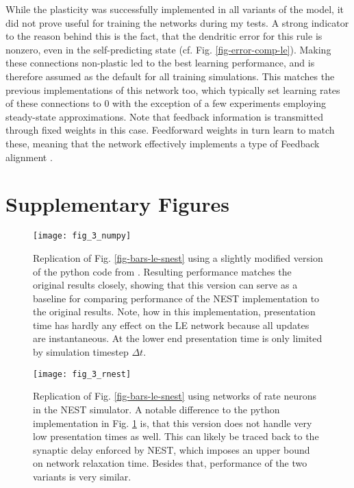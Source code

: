 While the plasticity was successfully implemented in all variants of the model, it did not prove useful for training the
networks during my tests. A strong indicator to the reason behind this is the fact, that the dendritic error for this
rule is nonzero, even in the self-predicting state (cf. Fig. \ref{fig-error-comp-le}). Making these connections
non-plastic led to the best learning performance, and is therefore assumed as the default for all training simulations.
This matches the previous implementations of this network too, which typically set learning rates of these connections
to $0$ with the exception of a few experiments employing steady-state approximations. Note that feedback information is
transmitted through fixed weights in this case. Feedforward weights in turn learn to match these, meaning that the
network effectively implements a type of Feedback alignment \cite{Lillicrap2014}.

\newpage
\section{Supplementary Figures}


\renewcommand{\thefigure}{S\arabic{figure}}
\begin{figure}[h!]
  \centering
  \texttt{[image: fig\_3\_numpy]}
  \caption{Replication of Fig. \ref{fig-bars-le-snest} using a slightly modified version of the python code from
    \cite{Haider2021}. Resulting performance matches the original results closely, showing that this version can serve
    as a baseline for comparing performance of the NEST implementation to the original results. Note, how in this
    implementation, presentation time has hardly any effect on the LE network because all updates are instantaneous.
    At the lower end presentation time is only limited by simulation timestep $\Delta t$.}
  \label{fig-bars-le-numpy}
\end{figure}


\begin{figure}[h!]
  \centering
  \texttt{[image: fig\_3\_rnest]}
  \caption{Replication of Fig. \ref{fig-bars-le-snest} using networks of rate neurons in the NEST simulator. A notable
    difference to the python implementation in Fig. \ref{fig-bars-le-numpy} is, that this version does not handle very
    low presentation times as well. This can likely be traced back to the synaptic delay enforced by NEST, which imposes
    an upper bound on network relaxation time. Besides that, performance of the two variants is very similar.}
  \label{fig-bars-le-rnest}
\end{figure}



